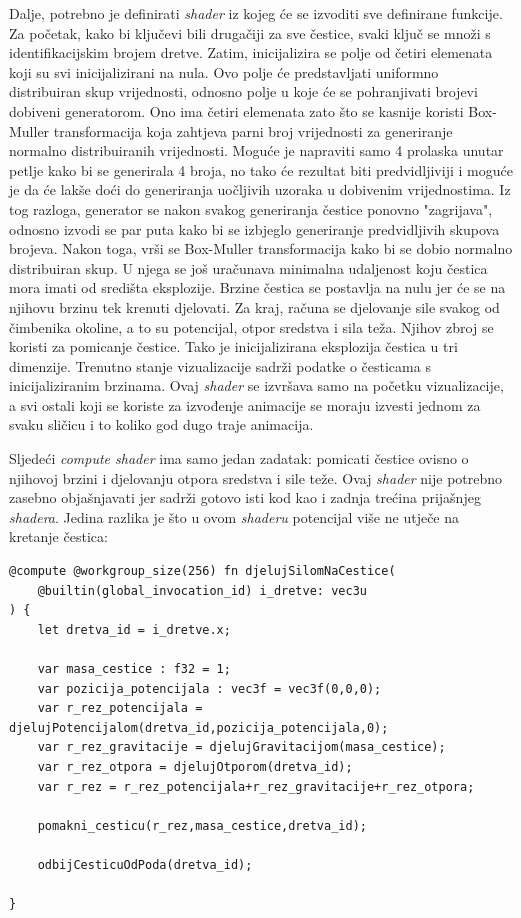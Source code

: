 \documentclass{foi}
\begin{document}
Dalje, potrebno je definirati \textit{shader} iz kojeg će se izvoditi sve definirane funkcije. Za početak, kako bi ključevi bili drugačiji za sve čestice, svaki ključ se množi s identifikacijskim brojem dretve. Zatim, inicijalizira se polje od četiri elemenata koji su svi inicijalizirani na nula. Ovo polje će predstavljati uniformno distribuiran skup vrijednosti, odnosno polje u koje će se pohranjivati brojevi dobiveni generatorom. Ono ima četiri elemenata zato što se kasnije koristi Box-Muller transformacija koja zahtjeva parni broj vrijednosti za generiranje normalno distribuiranih vrijednosti. Moguće je napraviti samo 4 prolaska unutar petlje kako bi se generirala 4 broja, no tako će rezultat biti predvidljiviji i moguće je da će lakše doći do generiranja uočljivih uzoraka u dobivenim vrijednostima. Iz tog razloga, generator se nakon svakog generiranja čestice ponovno "zagrijava", odnosno izvodi se par puta kako bi se izbjeglo generiranje predvidljivih skupova brojeva. Nakon toga, vrši se Box-Muller transformacija kako bi se dobio normalno distribuiran skup. U njega se još uračunava minimalna udaljenost koju čestica mora imati od središta eksplozije. Brzine čestica se postavlja na nulu jer će se na njihovu brzinu tek krenuti djelovati. Za kraj, računa se djelovanje sile svakog od čimbenika okoline, a to su potencijal, otpor sredstva i sila teža. Njihov zbroj se koristi za pomicanje čestice. Tako je inicijalizirana eksplozija čestica u tri dimenzije. Trenutno stanje vizualizacije sadrži podatke o česticama s inicijaliziranim brzinama. Ovaj \textit{shader} se izvršava samo na početku vizualizacije, a svi ostali koji se koriste za izvođenje animacije se moraju izvesti jednom za svaku sličicu i to koliko god dugo traje animacija. 

Sljedeći \textit{compute shader} ima samo jedan zadatak: pomicati čestice ovisno o njihovoj brzini i djelovanju otpora sredstva i sile teže. Ovaj \textit{shader} nije potrebno zasebno objašnjavati jer sadrži gotovo isti kod kao i zadnja trećina prijašnjeg \textit{shadera}. Jedina razlika je što u ovom \textit{shaderu} potencijal više ne utječe na kretanje čestica:

\begin{verbatim}
@compute @workgroup_size(256) fn djelujSilomNaCestice(
	@builtin(global_invocation_id) i_dretve: vec3u
) {
	let dretva_id = i_dretve.x;
	
	var masa_cestice : f32 = 1;
	var pozicija_potencijala : vec3f = vec3f(0,0,0);
	var r_rez_potencijala = djelujPotencijalom(dretva_id,pozicija_potencijala,0);
	var r_rez_gravitacije = djelujGravitacijom(masa_cestice);
	var r_rez_otpora = djelujOtporom(dretva_id);
	var r_rez = r_rez_potencijala+r_rez_gravitacije+r_rez_otpora;
	
	pomakni_cesticu(r_rez,masa_cestice,dretva_id);
	
	odbijCesticuOdPoda(dretva_id);
	
}
	
\end{verbatim}
\end{document}
